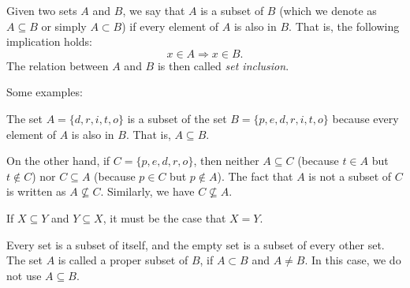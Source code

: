 \documentclass{article}
\begin{document}
Given two sets $A$ and $B$, we say that $A$ is a subset of $B$ (which we denote as $A\subseteq B$ or simply $A\subset B$) if every element of $A$ is also in $B$. That is, the following implication holds:
$$x\in A\Rightarrow x\in B.$$
The relation between $A$ and $B$ is then called {\em set inclusion}.

Some examples:

The set $A=\{d,r,i,t,o\}$ is a subset of the set $B=\{p,e,d,r,i,t,o\}$ because every element of $A$ is also in $B$. That is, $A\subseteq B$. 

On the other hand, if $C=\{p,e,d,r,o\}$, then neither $A \subseteq C$ (because $t\in A$ but $t\not\in C$) nor $C \subseteq A$ (because $p\in C$ but $p\not\in A$).  The fact that $A$ is not a subset of $C$ is written as $A\not\subseteq C$.  Similarly, we have $C\not\subseteq A$.

If $X\subseteq Y$ and $Y\subseteq X$, it must be the case that $X=Y$.

Every set is a subset of itself, and the empty set is a subset of every other set.  The set $A$ is called a proper subset of $B$, if $A\subset B$ and $A\neq B$.  In this case, we do not use $A\subseteq B$.
\end{document}
